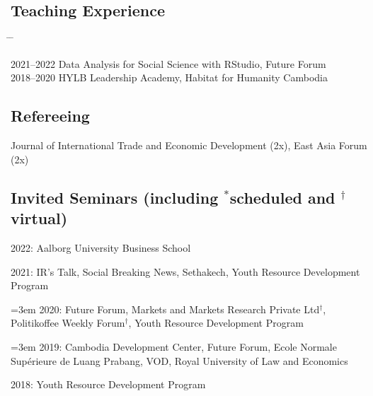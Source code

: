 \documentclass[10pt,a4paper]{article}
\newcommand{\tabbedblock}[1]{

	\begin{tabbing}
		\hspace{3cm} \= \hspace{4cm} \= \kill
		#1
	\end{tabbing}
}
\begin{document}
\subsection*{Teaching Experience}

\tabbedblock{
	2021--2022 \> Data Analysis for Social Science with RStudio, Future Forum\\
	
	2018--2020 \> HYLB Leadership Academy, Habitat for Humanity Cambodia
}

\subsection*{Refereeing}
	
	Journal of International Trade and Economic Development (2x), East Asia Forum (2x)

\subsection*{Invited Seminars (including $^\ast$scheduled and $^\dag$virtual)}

	2022: Aalborg University Business School

	2021: IR’s Talk, Social Breaking News, Sethakech, Youth Resource Development Program
				
\hangindent=3em
	2020: Future Forum, Markets and Markets Research Private Ltd$^\dag$, Politikoffee Weekly Forum$^\dag$, Youth Resource Development Program

\hangindent=3em
	2019: Cambodia Development Center, Future Forum, Ecole Normale Supérieure de Luang Prabang, VOD, Royal University of Law and Economics

	2018: Youth Resource Development Program
	
\end{document}
